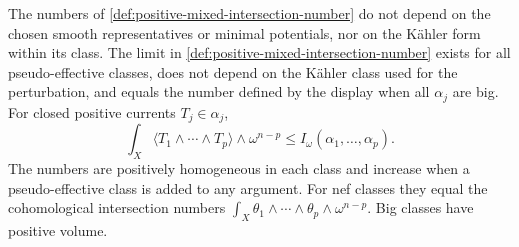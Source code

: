 \begin{proposition}\label{prop:positive-mixed-mass-bound}
The numbers of \cref{def:positive-mixed-intersection-number} do not depend on the chosen smooth representatives or minimal potentials, nor on the K\"ahler form within its class. The limit in \cref{def:positive-mixed-intersection-number} exists for all pseudo-effective classes, does not depend on the K\"ahler class used for the perturbation, and equals the number defined by the display when all $\alpha_j$ are big. For closed positive currents $T_j\in\alpha_j$,
\[
 \int_X\langle T_1\wedge\cdots\wedge T_p\rangle\wedge\omega^{n-p}
                       \leq I_\omega(\alpha_1,\ldots,\alpha_p).
\]
The numbers are positively homogeneous in each class and increase when a pseudo-effective class is added to any argument. For nef classes they equal the cohomological intersection numbers $\int_X\theta_1\wedge\cdots\wedge\theta_p\wedge\omega^{n-p}$. Big classes have positive volume.
\end{proposition}
